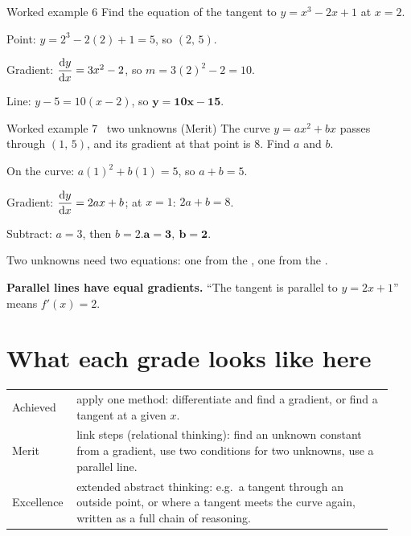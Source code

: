 \documentclass[11pt]{article}
\begin{document}
\begin{example}{Worked example 6}
Find the equation of the tangent to $y=x^{3}-2x+1$ at $x=2$.
\begin{steps}
\item Point: $y=2^{3}-2(2)+1=5$, so $(2,\,5)$.
\item Gradient: $\dfrac{\mathrm{d}y}{\mathrm{d}x}=3x^{2}-2$, so $m=3(2)^{2}-2=10$.
\item Line: $y-5=10(x-2)$, so $\mathbf{y=10x-15}$.
\end{steps}
\end{example}

\begin{example}{Worked example 7 \textperiodcentered\ two unknowns (Merit)}
The curve $y=ax^{2}+bx$ passes through $(1,\,5)$, and its gradient at that point is $8$. Find $a$ and $b$.
\begin{steps}
\item On the curve: $a(1)^{2}+b(1)=5$, so $a+b=5$.
\item Gradient: $\dfrac{\mathrm{d}y}{\mathrm{d}x}=2ax+b$; at $x=1$: $2a+b=8$.
\item Subtract: $a=3$, then $b=2$.\quad $\mathbf{a=3,\ b=2}$.
\end{steps}
Two unknowns need two equations: one from the , one from the .
\end{example}

\textbf{Parallel lines have equal gradients.} ``The tangent is parallel to $y=2x+1$'' means $f'(x)=2$.

\section{What each grade looks like here}\label{grades}
\begin{tabular}{@{}p{0.14\linewidth}p{0.80\linewidth}@{}}
\toprule
Achieved & apply one method: differentiate and find a gradient, or find a tangent at a given $x$.\\
Merit & link steps (relational thinking): find an unknown constant from a gradient, use two conditions for two unknowns, use a parallel line.\\
Excellence & extended abstract thinking: e.g.\ a tangent through an outside point, or where a tangent meets the curve again, written as a full chain of reasoning.\\
\bottomrule
\end{tabular}
\end{document}
